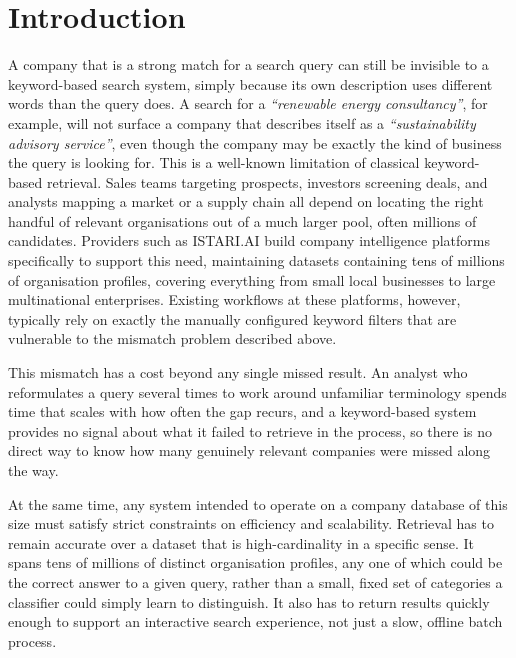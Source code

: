 \documentclass[a4paper,oneside,bibliography=totoc]{scrbook}
\begin{document}
\begingroup%
\hypersetup{hidelinks}%
\linespread{0.96}\selectfont%
\tableofcontents%
\endgroup



\mainmatter

\chapter{Introduction}
\label{ch:introduction}

A company that is a strong match for a search query can still be invisible to a keyword-based search system, simply because its own description uses different words than the query does. A search for a \textit{``renewable energy consultancy''}, for example, will not surface a company that describes itself as a \textit{``sustainability advisory service''}, even though the company may be exactly the kind of business the query is looking for. This is a well-known limitation of classical keyword-based retrieval. Sales teams targeting prospects, investors screening deals, and analysts mapping a market or a supply chain all depend on locating the right handful of relevant organisations out of a much larger pool, often millions of candidates. Providers such as ISTARI.AI build company intelligence platforms specifically to support this need, maintaining datasets containing tens of millions of organisation profiles, covering everything from small local businesses to large multinational enterprises. Existing workflows at these platforms, however, typically rely on exactly the manually configured keyword filters that are vulnerable to the mismatch problem described above.

This mismatch has a cost beyond any single missed result. An analyst who reformulates a query several times to work around unfamiliar terminology spends time that scales with how often the gap recurs, and a keyword-based system provides no signal about what it failed to retrieve in the process, so there is no direct way to know how many genuinely relevant companies were missed along the way.

At the same time, any system intended to operate on a company database of this size must satisfy strict constraints on efficiency and scalability. Retrieval has to remain accurate over a dataset that is high-cardinality in a specific sense. It spans tens of millions of distinct organisation profiles, any one of which could be the correct answer to a given query, rather than a small, fixed set of categories a classifier could simply learn to distinguish. It also has to return results quickly enough to support an interactive search experience, not just a slow, offline batch process.
\end{document}
